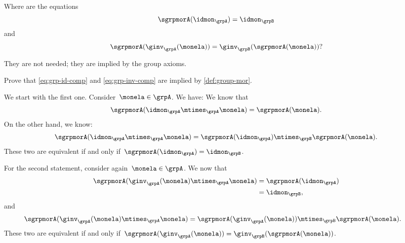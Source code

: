 Where are the equations
\begin{equation}
  \label{eq:grp-id-comp}
  \sgrpmorA (\idmon_\grpA) = \idmon_{\grpB}
\end{equation}
and
\begin{equation}
  \label{eq:grp-inv-comp}
  \sgrpmorA (\ginv_\grpA(\monela)) = \ginv_\grpB(\sgrpmorA(\monela))?
\end{equation}

They are not needed; they are implied by the group axioms.

\begin{exercise}
  Prove that \cref{eq:grp-id-comp} and \cref{eq:grp-inv-comp} are implied by \cref{def:group-mor}.
\end{exercise}
\begin{solution}
We start with the first one. Consider~$\monela \in \grpA$. We have:
  We know that
   \begin{equation*}
      \sgrpmorA(\idmon_\grpA \mtimes_\grpA \monela)=\sgrpmorA(\monela).
    \end{equation*}
  On the other hand, we know:
  \begin{equation*}
      \sgrpmorA(\idmon_\grpA \mtimes_\grpA \monela) = \sgrpmorA(\idmon_\grpA)\mtimes_\grpB \sgrpmorA(\monela).
\end{equation*}
  These two are equivalent if and only if~$\sgrpmorA(\idmon_\grpA)=\idmon_\grpB$.

For the second statement, consider again~$\monela \in \grpA$. We now that
  \begin{equation*}
  \begin{aligned}
    \sgrpmorA(\ginv_{\grpA}(\monela)\mtimes_{\grpA} \monela)&=\sgrpmorA(\idmon_\grpA)\\
    &=\idmon_\grpB,
  \end{aligned}
  \end{equation*}
  and
  \begin{equation*}
  \begin{aligned}
    \sgrpmorA(\ginv_{\grpA}(\monela)\mtimes_{\grpA} \monela)&=\sgrpmorA(\ginv_{\grpA}(\monela))\mtimes_{\grpB} \sgrpmorA(\monela).
  \end{aligned}
  \end{equation*}
These two are equivalent if and only if~$\sgrpmorA(\ginv_{\grpA}(\monela))=\ginv_{\grpB}(\sgrpmorA(\monela))$.

\end{solution}

